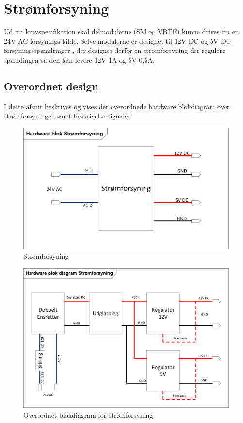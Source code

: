 \chapter{Strømforsyning}
Ud fra kravspecifikation skal delmodulerne (SM og VBTE) kunne drives fra en 24V AC forsynings kilde. Selve modulerne er designet til 12V DC og 5V DC forsyningsspændringer , der designes derfor en strømforsyning der regulere spændingen så den kan levere 12V 1A og 5V 0,5A.  

\section{Overordnet design}
I dette afsnit beskrives og vises det overordnede hardware blokdiagram over strømforsyningen samt beskrivelse signaler.
\begin{figure}[H]
\centering
\includegraphics[scale=0.6]{billeder/PowerSupply}
\caption{Strømforsyning}
\label{fig:PowerSubbly}
\end{figure}
\begin{figure}[H]
\centering
\includegraphics[scale=0.8]{billeder/PowerSupplyBlok}
\caption{Overordnet blokdiagram for strømforsyning}
\label{fig:PowerSubbly Blok}
\end{figure}
\newpage
